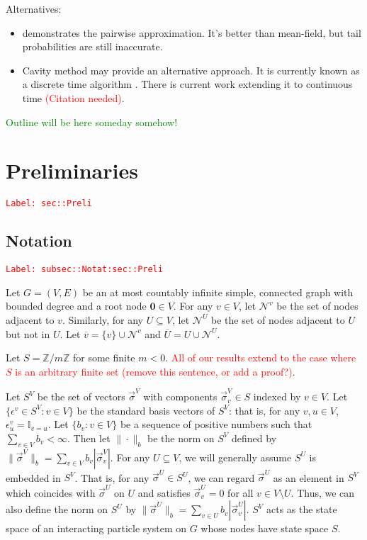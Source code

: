\documentclass[12pt]{article}
\newcommand{\mb}{\mathbb}
\newcommand{\mc}{\mathcal}
\newcommand{\ov}{\overline}
\newcommand{\ep}{\epsilon}
\newcommand{\tr}{\textcolor{red}}
\newcommand{\tg}{\textcolor{green}}
\newcommand{\labe}[1]{\tr{\texttt{Label: #1}}}
\newcommand{\ind}{\hspace{24pt}}
\renewcommand{\root}{\mathbf{0}}				%
\renewcommand{\v}{v}							%
\newcommand{\vv}{u}								%
\renewcommand{\U}{U}							%
\renewcommand{\S}{S}							%
\newcommand{\s}{\sigma}							%
\newcommand{\sv}{\vec{\s}}						%
\renewcommand{\b}{b}							%
\newcommand{\ev}{\ep}							%
\newcommand{\neigh}{\mc{N}}						%
\newcommand{\vind}[1]{^{#1}}					%
\newcommand{\carp}[1]{^{#1}}					%
\newcommand{\vsi}[1]{^{#1}}						%
\newcommand{\cind}[1]{_{#1}}					%
\newcommand{\cl}{\ov}							%
\begin{document}
Alternatives:

\begin{itemize}
\item \cite{Gas15} demonstrates the pairwise approximation. It's better than mean-field, but tail probabilities are still inaccurate.

\item Cavity method may provide an alternative approach. It is currently known as a discrete time algorithm \cite{Lac15}\cite{KanMon11}. There is current work extending it to continuous time \tr{(Citation needed)}.
\end{itemize}

\tg{Outline will be here someday somehow!}


\section{Preliminaries}
\label{sec::Preli}\labe{sec::Preli}

\subsection{Notation}
\label{subsec::Notat:sec::Preli}\labe{subsec::Notat:sec::Preli}

Let \(G = (V,E)\) be an at most countably infinite simple, connected graph with bounded degree and a root node \(\root \in V\). For any \(\v \in V\), let \(\neigh\vind{\v}\) be the set of nodes adjacent to \(\v\). Similarly, for any \(\U \subseteq V\), let \(\neigh\vind{\U}\) be the set of nodes adjacent to \(\U\) but not in \(\U\). Let \(\cl{\v} = \{\v\}\cup\neigh\vind{\v}\) and \(\cl{\U} = \U\cup \neigh\vind{\U}\). 

\ind Let \(S = \mb{Z}/m\mb{Z}\) for some finite \(m < 0\). \tr{All of our results extend to the case where \(\S\) is an arbitrary finite set (remove this sentence, or add a proof?)}.

\ind Let \(\S\carp{V}\) be the set of vectors \(\sv\vsi{V}\) with components \(\sv\cind{\v}\vsi{V} \in \S\) indexed by \(\v\in V\). Let \(\{\ev\vind{\v}\in\S\carp{V}: \v\in V\}\) be the standard basis vectors of \(\S\carp{V}\): that is, for any \(\v,\vv\in V\), \(\ev\vind{\v}\cind{\vv} = \mb{I}_{\v = \vv}\). Let \(\{\b\cind{\v}:\v\in V\}\) be a sequence of positive numbers such that \(\sum_{\v\in V} \b\cind{\v} < \infty\). Then let \(\|\cdot\|_{\b}\) be the norm on \(\S\carp{V}\) defined by \(\|\sv\vsi{V}\|_{\b} = \sum_{\v\in V} \b\cind{\v}|\sv\cind{\v}\vsi{V}|\). For any \(\U\subseteq V\), we will generally assume \(\S\carp{\U}\) is embedded in \(\S\carp{V}\). That is, for any \(\sv\vsi{\U}\in \S\carp{\U}\), we can regard \(\sv\vsi{\U}\) as an element in \(\S\carp{V}\) which coincides with \(\sv\vsi{\U}\) on \(\U\) and satisfies \(\sv\vsi{\U}\cind{\v} = 0\) for all \(\v\in V\setminus \U\). Thus, we can also define the norm on \(\S\carp{\U}\) by \(\|\sv\vsi{\U}\|_{\b} = \sum_{\v\in\U} \b\cind{\v}|\sv\cind{\v}\vsi{\U}|\). \(\S\carp{V}\) acts as the state space of an interacting particle system on \(G\) whose nodes have state space \(\S\).
\end{document}
